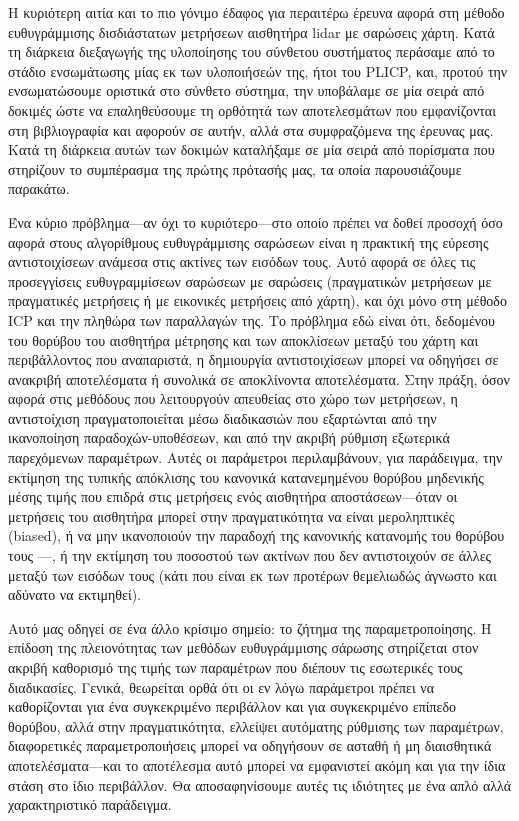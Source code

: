 Η κυριότερη αιτία και το πιο γόνιμο έδαφος για περαιτέρω έρευνα αφορά στη
μέθοδο ευθυγράμμισης δισδιάστατων μετρήσεων αισθητήρα lidar με σαρώσεις χάρτη.
Κατά τη διάρκεια διεξαγωγής της υλοποίησης του σύνθετου συστήματος περάσαμε από
το στάδιο ενσωμάτωσης μίας εκ των υλοποιήσεών της, ήτοι του PLICP, και, προτού
την ενσωματώσουμε οριστικά στο σύνθετο σύστημα, την υποβάλαμε σε μία σειρά από
δοκιμές ώστε να επαληθεύσουμε τη ορθότητά των αποτελεσμάτων που εμφανίζονται
στη βιβλιογραφία και αφορούν σε αυτήν, αλλά στα συμφραζόμενα της έρευνας μας.
Κατά τη διάρκεια αυτών των δοκιμών καταλήξαμε σε μία σειρά από πορίσματα που
στηρίζουν το συμπέρασμα της πρώτης πρότασής μας, τα οποία παρουσιάζουμε
παρακάτω.

Ένα κύριο πρόβλημα---αν όχι το κυριότερο---στο οποίο πρέπει να δοθεί προσοχή
όσο αφορά στους αλγορίθμους ευθυγράμμισης σαρώσεων είναι η πρακτική της εύρεσης
αντιστοιχίσεων ανάμεσα στις ακτίνες των εισόδων τους. Αυτό αφορά σε όλες τις
προσεγγίσεις ευθυγραμμίσεων σαρώσεων με σαρώσεις (πραγματικών μετρήσεων με
πραγματικές μετρήσεις ή με εικονικές μετρήσεις από χάρτη), και όχι μόνο στη
μέθοδο ICP και την πληθώρα των παραλλαγών της. Το πρόβλημα εδώ είναι ότι,
δεδομένου του θορύβου του αισθητήρα μέτρησης και των αποκλίσεων μεταξύ του
χάρτη και περιβάλλοντος που αναπαριστά, η δημιουργία αντιστοιχίσεων μπορεί να
οδηγήσει σε ανακριβή αποτελέσματα ή συνολικά σε αποκλίνοντα αποτελέσματα. Στην
πράξη, όσον αφορά στις μεθόδους που λειτουργούν απευθείας στο χώρο των
μετρήσεων, η αντιστοίχιση πραγματοποιείται μέσω διαδικασιών που εξαρτώνται από
την ικανοποίηση παραδοχών-υποθέσεων, και από την ακριβή ρύθμιση εξωτερικά
παρεχόμενων παραμέτρων. Αυτές οι παράμετροι περιλαμβάνουν, για παράδειγμα, την
εκτίμηση της τυπικής απόκλισης του κανονικά κατανεμημένου θορύβου μηδενικής
μέσης τιμής που επιδρά στις μετρήσεις ενός αισθητήρα αποστάσεων---όταν οι
μετρήσεις του αισθητήρα μπορεί στην πραγματικότητα να είναι μεροληπτικές
(biased), ή να μην ικανοποιούν την παραδοχή της κανονικής κατανομής του θορύβου
τους \cite{Cooper2018a}---, ή την εκτίμηση του ποσοστού των ακτίνων που δεν
αντιστοιχούν σε άλλες μεταξύ των εισόδων τους (κάτι που είναι εκ των προτέρων
θεμελιωδώς άγνωστο και αδύνατο να εκτιμηθεί).

Αυτό μας οδηγεί σε ένα άλλο κρίσιμο σημείο: το ζήτημα της παραμετροποίησης. Η
επίδοση της πλειονότητας των μεθόδων ευθυγράμμισης σάρωσης στηρίζεται στον
ακριβή καθορισμό της τιμής των παραμέτρων που διέπουν τις εσωτερικές τους
διαδικασίες. Γενικά, θεωρείται ορθά ότι οι εν λόγω παράμετροι πρέπει να
καθορίζονται για ένα συγκεκριμένο περιβάλλον και για συγκεκριμένο επίπεδο
θορύβου, αλλά στην πραγματικότητα, ελλείψει αυτόματης ρύθμισης των παραμέτρων,
διαφορετικές παραμετροποιήσεις μπορεί να οδηγήσουν σε ασταθή ή μη διαισθητικά
αποτελέσματα---και το αποτέλεσμα αυτό μπορεί να εμφανιστεί ακόμη και για την
ίδια στάση στο ίδιο περιβάλλον. Θα αποσαφηνίσουμε αυτές τις ιδιότητες με ένα
απλό αλλά χαρακτηριστικό παράδειγμα.

